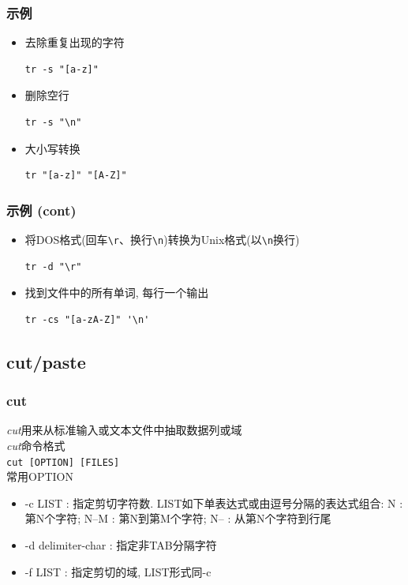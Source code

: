 \documentclass[compress]{beamer}
\begin{document}
\begin{frame}[fragile]
\frametitle{示例}

\begin{itemize}
\item 去除重复出现的字符 \\
\begin{Verbatim}
tr -s "[a-z]"
\end{Verbatim}

\item 删除空行 \\
\begin{Verbatim}
tr -s "\n"
\end{Verbatim}

\item 大小写转换\\
\begin{Verbatim}
tr "[a-z]" "[A-Z]"
\end{Verbatim}
\end{itemize}

\end{frame}

\begin{frame}[fragile]
\frametitle{示例 (cont)}

\begin{itemize}
\item 将DOS格式(回车\verb~\r~、换行\verb~\n~)转换为Unix格式(以\verb~\n~换行)\\
\begin{Verbatim}
tr -d "\r"
\end{Verbatim}

\item 找到文件中的所有单词, 每行一个输出
\begin{Verbatim}
tr -cs "[a-zA-Z]" '\n'
\end{Verbatim}
\end{itemize}

\end{frame}

\subsection{cut/paste}

\begin{frame}[fragile]
\frametitle{cut}
\emph{cut}用来从标准输入或文本文件中抽取数据列或域\\
\emph{cut}命令格式\\
\verb~cut [OPTION] [FILES]~\\
常用OPTION
\begin{itemize}
\item -c LIST : 指定剪切字符数. LIST如下单表达式或由逗号分隔的表达式组合:
N : 第N个字符; N--M : 第N到第M个字符; N-- : 从第N个字符到行尾

\item -d delimiter-char : 指定非TAB分隔字符
\item -f LIST : 指定剪切的域, LIST形式同-c
\end{itemize}

\end{frame}
\end{document}
